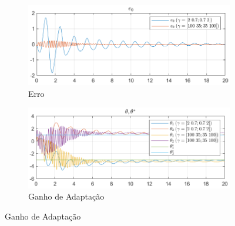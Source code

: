 \documentclass[10pt]{article}
\begin{document}
\begin{figure}[h!]
    \centering
    \begin{subfigure}[b]{0.45\textwidth}
        \centering
        \includegraphics[width=\textwidth]{img/fig10a.png}
        \caption{Erro}
    \end{subfigure}
    \begin{subfigure}[b]{0.45\textwidth}
        \centering
        \includegraphics[width=\textwidth]{img/fig10b.png}
        \caption{Ganho de Adaptação}
    \end{subfigure}

    \vspace{0.5cm}


\end{figure}
\end{document}
